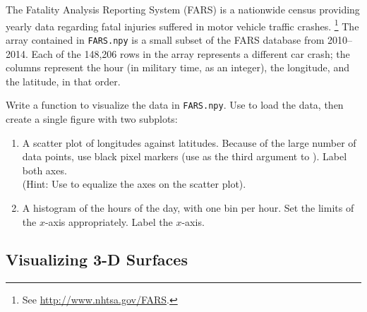 \begin{problem} %
The Fatality Analysis Reporting System (FARS) is a nationwide census providing yearly data regarding fatal injuries suffered in motor vehicle traffic crashes.%
\footnote{See \url{http://www.nhtsa.gov/FARS}.}
The array contained in \texttt{FARS.npy} is a small subset of the FARS database from 2010--2014.
Each of the 148,206 rows in the array represents a different car crash; the columns represent the hour (in military time, as an integer), the longitude, and the latitude, in that order.

Write a function to visualize the data in \texttt{FARS.npy}.
Use  to load the data, then create a single figure with two subplots:
%
\begin{enumerate}
\item A scatter plot of longitudes against latitudes.
Because of the large number of data points, use black pixel markers (use  as the third argument to ).
Label both axes.
\\
(Hint: Use  to equalize the axes on the scatter plot).

\item A histogram of the hours of the day, with one bin per hour.
Set the limits of the $x$-axis appropriately.
Label the $x$-axis.
\end{enumerate}
\end{problem}


\subsection*{Visualizing 3-D Surfaces} %

